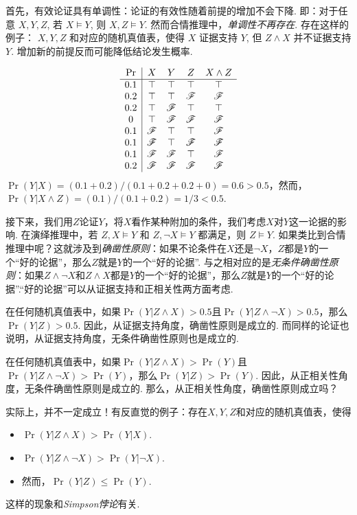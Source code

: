 首先，有效论证具有单调性：论证的有效性随着前提的增加不会下降. 即：对于任意 $X, Y, Z$, 若 $X\models Y$, 则 $X,Z\models Y$. 然而合情推理中，\emph{单调性不再存在}. 存在这样的例子： $X, Y, Z$ 和对应的随机真值表，使得 $X$ 证据支持 $Y$, 但 $Z\wedge X$ 并不证据支持 $Y$. 增加新的前提反而可能降低结论发生概率.

\begin{example}[非单调性：例子]
\[\begin{array}{c|ccccc}
        \Pr & X & Y & Z & X \wedge Z \\ \hline
        0.1 & \top & \top & \top & \top\\
        0.2 & \top & \top & \mathscr{F} & \mathscr{F}\\
        0.2 & \top & \mathscr{F} & \top & \top\\
        0 & \top & \mathscr{F} & \mathscr{F} & \mathscr{F}\\ 
        0.1 & \mathscr{F} & \top & \top & \mathscr{F}\\ 
        0.1 & \mathscr{F} & \top & \mathscr{F} & \mathscr{F}\\
        0.1 & \mathscr{F} & \mathscr{F} & \top & \mathscr{F}\\
        0.2 & \mathscr{F} & \mathscr{F} & \mathscr{F} & \mathscr{F}\\
\end{array}\]
$\Pr(Y|X) = (0.1 + 0.2) / (0.1 + 0.2 + 0.2 + 0) = 0.6 > 0.5$，然而，$\Pr(Y|X \wedge Z) = (0.1) / (0.1 + 0.2) = 1/3 < 0.5$.
\end{example}

接下来，我们用$Z$论证$Y$，将$X$看作某种附加的条件，我们考虑$X$对$Y$这一论据的影响. 在演绎推理中，若 $Z,X\models Y$ 和 $Z,\lnot X\models Y$ 都满足，则 $Z\models Y$. 如果类比到合情推理中呢？这就涉及到\emph{确凿性原则}：如果不论条件在$X$还是$\neg X$，$Z$都是$Y$的一个``好的论据''，那么$Z$就是$Y$的一个``好的论据''. 与之相对应的是\emph{无条件确凿性原则}：如果$Z\wedge\neg X$和$Z\wedge X$都是$Y$的一个``好的论据''，那么$Z$就是$Y$的一个``好的论据''.``好的论据''可以从证据支持和正相关性两方面考虑.

在任何随机真值表中，如果$\Pr(Y|Z\wedge X)>0.5$且$\Pr(Y|Z\wedge\neg X)>0.5$，那么$\Pr(Y|Z)>0.5$. 因此，从证据支持角度，确凿性原则是成立的. 而同样的论证也说明，从证据支持角度，无条件确凿性原则也是成立的.

在任何随机真值表中，如果$\Pr(Y|Z\wedge X)>\Pr(Y)$且$\Pr(Y|Z\wedge\neg X)>\Pr(Y)$，那么$\Pr(Y|Z)>\Pr(Y)$. 因此，从正相关性角度，无条件确凿性原则是成立的. 那么，从正相关性角度，确凿性原则成立吗？

实际上，并不一定成立！有反直觉的例子：存在$X, Y, Z$和对应的随机真值表，使得
    \begin{itemize}
        \item $\Pr(Y| Z\wedge X)>\Pr(Y|X)$.
        \item $\Pr(Y| Z \wedge \neg X)>\Pr(Y|\neg X)$.
        \item 然而，$\Pr(Y|Z)\le \Pr(Y)$.
    \end{itemize}
这样的现象和\emph{Simpson悖论}有关. 

